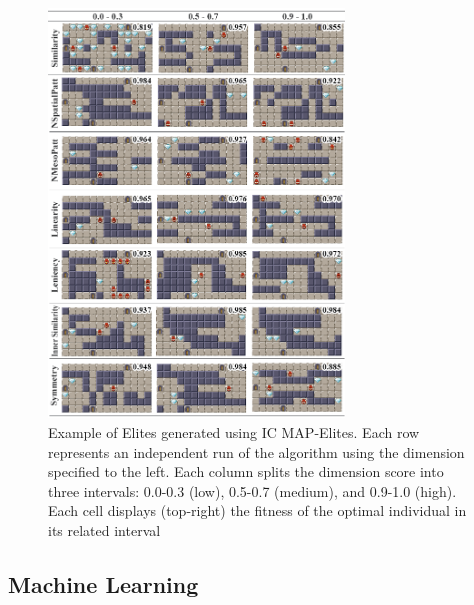 \begin{figure}[!h]
\centerline{\includegraphics[width=0.7\textwidth]{figures/ICMAPE-figs/figure-all-dimensions-final.png}}
\caption{Example of Elites generated using IC MAP-Elites. Each row represents an independent run of the algorithm using the dimension specified to the left. Each column splits the dimension score into three intervals: 0.0-0.3 (low), 0.5-0.7 (medium), and 0.9-1.0 (high). Each cell displays (top-right) the fitness of the optimal individual in its related interval} \label{fig:dimension-examples}
\end{figure}




\subsection{Machine Learning}

